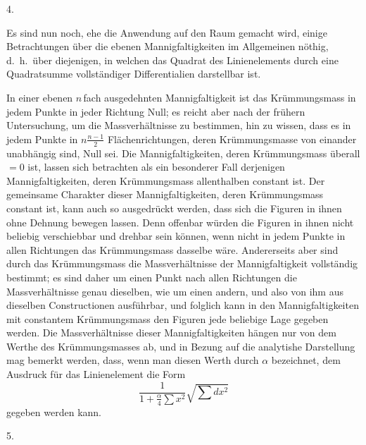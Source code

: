 \documentclass[a4paper,12pt]{article}
\begin{document}
\medbreak

\centerline{4.}

\nobreak\medskip

Es sind nun noch, ehe die Anwendung auf den Raum gemacht wird,
einige Betrachtungen \"{u}ber die ebenen Mannigfaltigkeiten im
Allgemeinen n\"{o}thig, d.~h.\ \"{u}ber diejenigen, in welchen
das Quadrat des Linienelements durch eine Quadratsumme
vollst\"{a}ndiger Differentialien darstellbar ist.

In einer ebenen $n \,$\-fach ausgedehnten Mannigfaltigkeit ist das
Kr\"{u}mmungsmass in jedem Punkte in jeder Richtung Null; es
reicht aber nach der fr\"{u}hern Untersuchung, um die
Massverh\"{a}ltnisse zu bestimmen, hin zu wissen, dass es in
jedem Punkte in $\displaystyle n \frac{n-1}{2}$
Fl\"{a}chenrichtungen, deren Kr\"{u}mmungsmasse von einander
unabh\"{a}ngig sind, Null sei.  Die Mannigfaltigkeiten, deren
Kr\"{u}mmungsmass \"{u}berall $= 0$ ist, lassen sich betrachten
als ein besonderer Fall derjenigen Mannigfaltigkeiten, deren
Kr\"{u}mmungsmass allenthalben constant ist.  Der gemeinsame
Charakter dieser Mannigfaltigkeiten, deren Kr\"{u}mmungsmass
constant ist, kann auch so ausgedr\"{u}ckt werden, dass sich die
Figuren in ihnen ohne Dehnung bewegen lassen.  Denn offenbar
w\"{u}rden die Figuren in ihnen nicht beliebig verschiebbar und
drehbar sein k\"{o}nnen, wenn nicht in jedem Punkte in allen
Richtungen das Kr\"{u}mmungsmass dasselbe w\"{a}re.  Andererseits
aber sind durch das Kr\"{u}mmungsmass die Massverh\"{a}ltnisse
der Mannigfaltigkeit vollst\"{a}ndig bestimmt; es sind daher um
einen Punkt nach allen Richtungen die Massverh\"{a}ltnisse genau
dieselben, wie um einen andern, und also von ihm aus dieselben
Constructionen ausf\"{u}hrbar, und folglich kann in den
Mannigfaltigkeiten mit constantem Kr\"{u}mmungsmass den Figuren
jede beliebige Lage gegeben werden.  Die Massverh\"{a}ltnisse
dieser Mannigfaltigkeiten h\"{a}ngen nur von dem Werthe des
Kr\"{u}mmungsmasses ab, und in Bezung auf die analytishe
Darstellung mag bemerkt werden, dass, wenn man diesen Werth durch
$\alpha$ bezeichnet, dem Ausdruck f\"{u}r das Linienelement die
Form
\[ \frac{1}{\displaystyle 1 + \frac{\alpha}{4} {\textstyle\sum} x^2}
   \sqrt{ {\textstyle\sum} dx^2 } \]
gegeben werden kann.

\medbreak

\centerline{5.}

\nobreak\medskip
\end{document}
